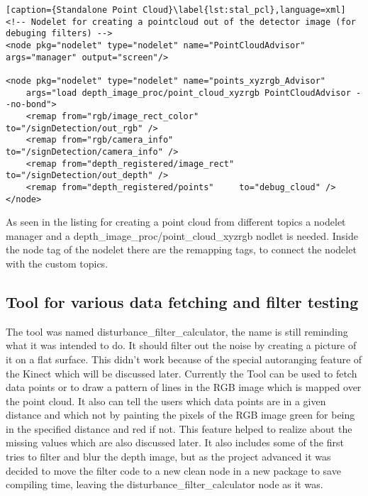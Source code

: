 \begin{lstlisting}[caption={Standalone Point Cloud}\label{lst:stal_pcl},language=xml]
<!-- Nodelet for creating a pointcloud out of the detector image (for debuging filters) -->
<node pkg="nodelet" type="nodelet" name="PointCloudAdvisor" args="manager" output="screen"/>

<node pkg="nodelet" type="nodelet" name="points_xyzrgb_Advisor" 
	args="load depth_image_proc/point_cloud_xyzrgb PointCloudAdvisor --no-bond">
    <remap from="rgb/image_rect_color"        to="/signDetection/out_rgb" />
    <remap from="rgb/camera_info"             to="/signDetection/camera_info" />
    <remap from="depth_registered/image_rect" to="/signDetection/out_depth" />
    <remap from="depth_registered/points"     to="debug_cloud" />
</node>
\end{lstlisting}



As seen in the listing for creating a point cloud from different topics a nodelet manager and a 
depth\_image\_proc/point\_cloud\_xyzrgb nodlet is needed. Inside the node tag of the nodelet
there are the remapping tags, to connect the nodelet with the custom topics.

\subsection{Tool for various data fetching and filter testing}
The tool was named disturbance\_filter\_calculator, the name is still reminding what it was intended to do. It should
filter out the noise by creating a picture of it on a flat surface. This didn't work because of the special autoranging
feature of the Kinect which will be discussed later. Currently the Tool can be used to fetch data points or to
draw a pattern of lines in the RGB image which is mapped over the point cloud. It also can tell the users which data points
are in a given distance and which not by painting the pixels of the RGB image green for being in the specified distance
and red if not. This feature helped to realize about the missing values which are also discussed later. It also includes
some of the first tries to filter and blur the depth image, but as the project advanced it was decided to move the 
filter code to a new clean node in a new package to save compiling time, leaving the disturbance\_filter\_calculator 
node as it was.


